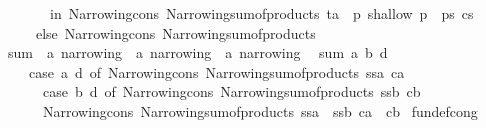\begin{isabellebody}
\ \ \ \ \ \ \ in\ Narrowing{\isacharunderscore}{\kern0pt}cons\ {\isacharparenleft}{\kern0pt}Narrowing{\isacharunderscore}{\kern0pt}sum{\isacharunderscore}{\kern0pt}of{\isacharunderscore}{\kern0pt}products\ {\isacharbrackleft}{\kern0pt}ta\ {\isacharhash}{\kern0pt}\ p{\isachardot}{\kern0pt}\ shallow{\isacharcomma}{\kern0pt}\ p\ {\isasymleftarrow}\ ps{\isacharbrackright}{\kern0pt}{\isacharparenright}{\kern0pt}\ cs{\isacharparenright}{\kern0pt}\isanewline
\ \ \ \ \ else\ Narrowing{\isacharunderscore}{\kern0pt}cons\ {\isacharparenleft}{\kern0pt}Narrowing{\isacharunderscore}{\kern0pt}sum{\isacharunderscore}{\kern0pt}of{\isacharunderscore}{\kern0pt}products\ {\isacharbrackleft}{\kern0pt}{\isacharbrackright}{\kern0pt}{\isacharparenright}{\kern0pt}\ {\isacharbrackleft}{\kern0pt}{\isacharbrackright}{\kern0pt}{\isacharparenright}{\kern0pt}{\isachardoublequoteclose}\isanewline
\isanewline
{}\isamarkupfalse%
\ sum\ {\isacharcolon}{\kern0pt}{\isacharcolon}{\kern0pt}\ {\isachardoublequoteopen}{\isacharprime}{\kern0pt}a\ narrowing\ {\isacharequal}{\kern0pt}{\isachargreater}{\kern0pt}\ {\isacharprime}{\kern0pt}a\ narrowing\ {\isacharequal}{\kern0pt}{\isachargreater}{\kern0pt}\ {\isacharprime}{\kern0pt}a\ narrowing{\isachardoublequoteclose}\isanewline
{}\isanewline
\ \ {\isachardoublequoteopen}sum\ a\ b\ d\ {\isacharequal}{\kern0pt}\isanewline
\ \ \ \ {\isacharparenleft}{\kern0pt}case\ a\ d\ of\ Narrowing{\isacharunderscore}{\kern0pt}cons\ {\isacharparenleft}{\kern0pt}Narrowing{\isacharunderscore}{\kern0pt}sum{\isacharunderscore}{\kern0pt}of{\isacharunderscore}{\kern0pt}products\ ssa{\isacharparenright}{\kern0pt}\ ca\ {\isasymRightarrow}\isanewline
\ \ \ \ \ \ case\ b\ d\ of\ Narrowing{\isacharunderscore}{\kern0pt}cons\ {\isacharparenleft}{\kern0pt}Narrowing{\isacharunderscore}{\kern0pt}sum{\isacharunderscore}{\kern0pt}of{\isacharunderscore}{\kern0pt}products\ ssb{\isacharparenright}{\kern0pt}\ cb\ {\isasymRightarrow}\isanewline
\ \ \ \ \ \ Narrowing{\isacharunderscore}{\kern0pt}cons\ {\isacharparenleft}{\kern0pt}Narrowing{\isacharunderscore}{\kern0pt}sum{\isacharunderscore}{\kern0pt}of{\isacharunderscore}{\kern0pt}products\ {\isacharparenleft}{\kern0pt}ssa\ {\isacharat}{\kern0pt}\ ssb{\isacharparenright}{\kern0pt}{\isacharparenright}{\kern0pt}\ {\isacharparenleft}{\kern0pt}ca\ {\isacharat}{\kern0pt}\ cb{\isacharparenright}{\kern0pt}{\isacharparenright}{\kern0pt}{\isachardoublequoteclose}\isanewline
\isanewline
{}\isamarkupfalse%
\ {\isacharbrackleft}{\kern0pt}fundef{\isacharunderscore}{\kern0pt}cong{\isacharbrackright}{\kern0pt}{\isacharcolon}{\kern0pt}\isanewline

\end{isabellebody}
